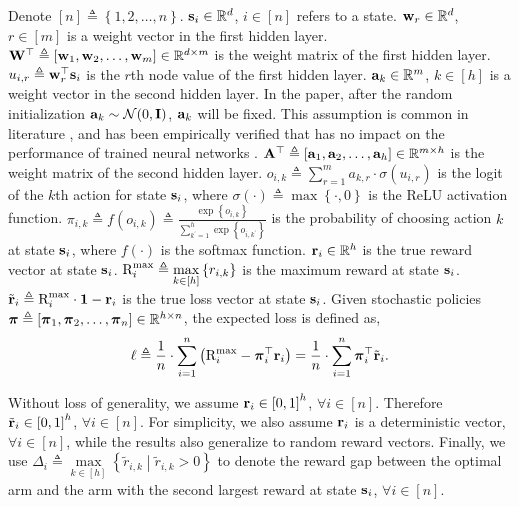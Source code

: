 Denote $[n] \triangleq \left\{ 1,2, \dots, n \right\}$. ${\mathbf{s}}_i \in {\mathbb{R}}^d$, $i \in [n]$ refers to a state. ${\mathbf{w}}_r \in {\mathbb{R}}^d$, $r \in [m]$ is a weight vector in the first hidden layer. ${\mathbf{W}}^\top \triangleq \left[ {\mathbf{w}}_1, {\mathbf{w}}_2, \dots, {\mathbf{w}}_m \right] \in {\mathbb{R}}^{d \times m}$ is the weight matrix of the first hidden layer. $u_{i,r} \triangleq {\mathbf{w}}_r^\top {\mathbf{s}}_i$ is the $r$th node value of the first hidden layer. ${\mathbf{a}}_k \in {\mathbb{R}}^m$, $k \in [h]$ is a weight vector in the second hidden layer. In the paper, after the random initialization ${\mathbf{a}}_k \sim {\mathcal{N}}(0, {\mathbf{I}})$, ${\mathbf{a}}_k$ will be fixed. This assumption is common in literature \citep{li2018learning,du2018gradientA,du2018gradientB,allen2018convergenceA,allen2018convergenceB}, and has been empirically verified that has no impact on the performance of trained neural networks \citep{hoffer2018fix}. ${\mathbf{A}}^\top \triangleq \left[ {\mathbf{a}}_1, {\mathbf{a}}_2, \dots, {\mathbf{a}}_h \right] \in {\mathbb{R}}^{m \times h}$ is the weight matrix of the second hidden layer. $o_{i,k} \triangleq \sum\limits_{r=1}^{m}{a_{k,r} \cdot \sigma\left( u_{i,r} \right)}$ is the logit of the $k$th action for state ${\mathbf{s}}_i$, where $\sigma(\cdot) \triangleq \max\left\{ \cdot, 0 \right\}$ is the ReLU activation function. $\pi_{i,k} \triangleq f\left( o_{i,k} \right) \triangleq \frac{\exp\left\{ o_{i,k} \right\}}{\sum\limits_{k^\prime = 1}^{h}{\exp\left\{ o_{i,k^\prime} \right\}}}$ is the probability of choosing action $k$ at state ${\mathbf{s}}_i$, where $f(\cdot)$ is the softmax function. ${\mathbf{r}}_i \in {\mathbb{R}}^h$ is the true reward vector at state ${\mathbf{s}}_i$. ${\text{R}}_i^{\max} \triangleq \max\limits_{k \in [h]}\left\{ r_{i,k} \right\}$ is the maximum reward at state ${\mathbf{s}}_i$. ${\tilde{\mathbf{r}}}_i \triangleq {\text{R}}_i^{\max} \cdot {\mathbf{1}} - {\mathbf{r}}_i$ is the true loss vector at state ${\mathbf{s}}_i$. Given stochastic policies ${\boldsymbol{\pi}} \triangleq \left[ {\boldsymbol{\pi}}_1, {\boldsymbol{\pi}}_2, \dots, {\boldsymbol{\pi}}_n \right] \in {\mathbb{R}}^{h \times n}$, the expected loss is defined as,
\begin{equation}
\label{eq:expected_loss}
\begin{split}
    \ell \triangleq \frac{1}{n} \cdot \sum\limits_{i=1}^{n}{ \left( {\text{R}}_i^{\max} - {\boldsymbol{\pi}}_i^\top {\mathbf{r}}_i \right) } = \frac{1}{n} \cdot \sum\limits_{i=1}^{n}{ {\boldsymbol{\pi}}_{i}^\top {\tilde{\mathbf{r}}}_{i} }.
\end{split}
\end{equation}

Without loss of generality, we assume ${\mathbf{r}}_i \in \left[ 0, 1 \right]^h$, $\forall i \in [n]$. Therefore ${\tilde{\mathbf{r}}}_i \in \left[ 0, 1 \right]^h$, $\forall i \in [n]$. For simplicity, we also assume ${\mathbf{r}}_i$ is a deterministic vector, $\forall i \in [n]$, while the results also generalize to random reward vectors. Finally, we use $\Delta_i \triangleq \max\limits_{k \in [h]}\left\{ \tilde{r}_{i,k} \middle| \tilde{r}_{i,k} > 0 \right\}$ to denote the reward gap between the optimal arm and the arm with the second largest reward at state ${\mathbf{s}}_i$, $\forall i \in [n]$.